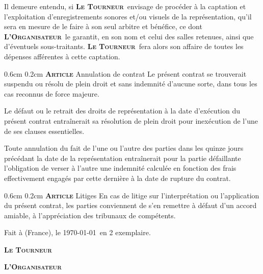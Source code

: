 \documentclass[a4paper,10pt]{article}
\makeatletter
\newcommand{\ContratNombreExemplaires}{2}
\newcommand{\PR}{\textbf{\textsc{Le Tourneur}}}
\newcommand{\OR}{\textbf{\textsc{L'Organisateur}}}
\renewcommand\section{\@startsection{section}{1}{\z@}%
	{0.6cm}%
	{0.2cm}%
	{\noindent\large\bfseries\scshape Article }}
\makeatother
\begin{document}
Il demeure entendu, si \PR\ envisage de proc\'eder \`a la captation et
l'exploitation d'enregistrements sonores et/ou visuels de la
repr\'esentation, qu'il sera en mesure de le faire \`a son seul
arbitre et b\'en\'efice, ce dont \OR\ le garantit, en son nom et celui
des salles retenues, ainsi que d'\'eventuels sous-traitants. \PR\ fera
alors son affaire de toutes les d\'epenses aff\'erentes \`a cette
captation.

\section{Annulation de contrat}
\label{sec:annulation}
Le pr\'esent contrat se trouverait suspendu ou r\'esolu de plein droit
et sans indemnit\'e d'aucune sorte, dans tous les cas reconnus de
force majeure.

Le d\'efaut ou le retrait des droits de repr\'esentation \`a la date
d'ex\'ecution du pr\'esent contrat entra\^inerait sa r\'esolution de
plein droit pour inex\'ecution de l'une de ses clauses essentielles.

Toute annulation du fait de l'une ou l'autre des parties dans les
quinze jours pr\'ec\'edant la date de la repr\'esentation
entra\^inerait pour la partie d\'efaillante l'obligation de verser \`a
l'autre une indemnit\'e calcul\'ee en fonction des frais effectivement
engag\'es par cette derni\`ere \`a la date de rupture du contrat.

\section{Litiges}
\label{sec:litiges}
En cas de litige sur l'interpr\'etation ou l'application du pr\'esent
contrat, les parties conviennent de s'en remettre \`a d\'efaut d'un
accord amiable, \`a l'appr\'eciation des tribunaux de compétents.

\vfill Fait \`a \TourneurVille{} (France), le \today\ en
\ContratNombreExemplaires{}
exemplaire\ifthenelse{\ContratNombreExemplaires>1}{s}{}.

\lfoot{}
\begin{minipage}[h!]{0.5\linewidth}
    \begin{center}
        \PR
    \end{center}
\end{minipage}
\begin{minipage}[h!]{0.5\linewidth}
    \begin{center}
        \OR
    \end{center}
\end{minipage}
\vfill
\end{document}
